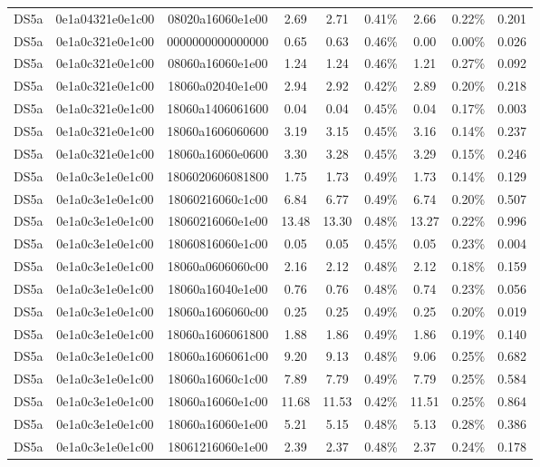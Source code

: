 \begin{tabular}{|c|c c|c|c c|c c|c|}
  DS5a & 0e1a04321e0e1c00 & 08020a16060e1e00 & 2.69 & 2.71 & 0.41\% & 2.66 & 0.22\% & 0.201 \\
  DS5a & 0e1a0c321e0e1c00 & 0000000000000000 & 0.65 & 0.63 & 0.46\% & 0.00 & 0.00\% & 0.026 \\
  DS5a & 0e1a0c321e0e1c00 & 08060a16060e1e00 & 1.24 & 1.24 & 0.46\% & 1.21 & 0.27\% & 0.092 \\
  DS5a & 0e1a0c321e0e1c00 & 18060a02040e1e00 & 2.94 & 2.92 & 0.42\% & 2.89 & 0.20\% & 0.218 \\
  DS5a & 0e1a0c321e0e1c00 & 18060a1406061600 & 0.04 & 0.04 & 0.45\% & 0.04 & 0.17\% & 0.003 \\
  DS5a & 0e1a0c321e0e1c00 & 18060a1606060600 & 3.19 & 3.15 & 0.45\% & 3.16 & 0.14\% & 0.237 \\
  DS5a & 0e1a0c321e0e1c00 & 18060a16060e0600 & 3.30 & 3.28 & 0.45\% & 3.29 & 0.15\% & 0.246 \\
  DS5a & 0e1a0c3e1e0e1c00 & 1806020606081800 & 1.75 & 1.73 & 0.49\% & 1.73 & 0.14\% & 0.129 \\
  DS5a & 0e1a0c3e1e0e1c00 & 18060216060c1c00 & 6.84 & 6.77 & 0.49\% & 6.74 & 0.20\% & 0.507 \\
  DS5a & 0e1a0c3e1e0e1c00 & 18060216060e1e00 & 13.48 & 13.30 & 0.48\% & 13.27 & 0.22\% & 0.996 \\
  DS5a & 0e1a0c3e1e0e1c00 & 18060816060e1c00 & 0.05 & 0.05 & 0.45\% & 0.05 & 0.23\% & 0.004 \\
  DS5a & 0e1a0c3e1e0e1c00 & 18060a0606060c00 & 2.16 & 2.12 & 0.48\% & 2.12 & 0.18\% & 0.159 \\
  DS5a & 0e1a0c3e1e0e1c00 & 18060a16040e1e00 & 0.76 & 0.76 & 0.48\% & 0.74 & 0.23\% & 0.056 \\
  DS5a & 0e1a0c3e1e0e1c00 & 18060a1606060c00 & 0.25 & 0.25 & 0.49\% & 0.25 & 0.20\% & 0.019 \\
  DS5a & 0e1a0c3e1e0e1c00 & 18060a1606061800 & 1.88 & 1.86 & 0.49\% & 1.86 & 0.19\% & 0.140 \\
  DS5a & 0e1a0c3e1e0e1c00 & 18060a1606061c00 & 9.20 & 9.13 & 0.48\% & 9.06 & 0.25\% & 0.682 \\
  DS5a & 0e1a0c3e1e0e1c00 & 18060a16060c1c00 & 7.89 & 7.79 & 0.49\% & 7.79 & 0.25\% & 0.584 \\
  DS5a & 0e1a0c3e1e0e1c00 & 18060a16060e1c00 & 11.68 & 11.53 & 0.42\% & 11.51 & 0.25\% & 0.864 \\
  DS5a & 0e1a0c3e1e0e1c00 & 18060a16060e1e00 & 5.21 & 5.15 & 0.48\% & 5.13 & 0.28\% & 0.386 \\
  DS5a & 0e1a0c3e1e0e1c00 & 18061216060e1e00 & 2.39 & 2.37 & 0.48\% & 2.37 & 0.24\% & 0.178 \\

\end{tabular}
